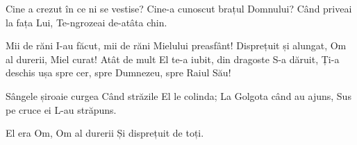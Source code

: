 \beginverse
Cine a crezut în ce ni se vestise?
Cine-a cunoscut brațul Domnului?
Când priveai la fața Lui,
Te-ngrozeai de-atâta chin.
\endverse

\beginchorus
Mii de răni I-au făcut, mii de răni Mielului preasfânt!
Disprețuit și alungat, Om al durerii, Miel curat!
Atât de mult El te-a iubit, din dragoste S-a dăruit,
Ți-a deschis ușa spre cer, spre Dumnezeu, spre Raiul Său!
\endchorus

\beginverse
Sângele șiroaie curgea
Când străzile El le colinda;
La Golgota când au ajuns,
Sus pe cruce ei L-au străpuns.
\endverse

\beginverse*
El era Om, Om al durerii
Și disprețuit de toți.
\endverse
\endsong